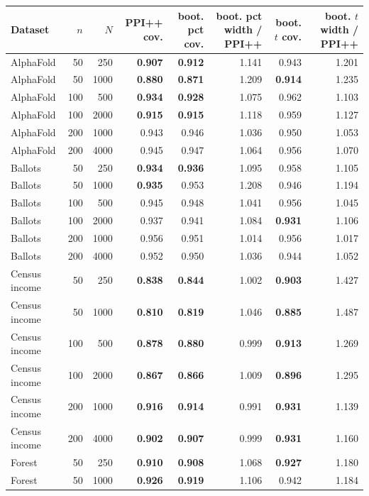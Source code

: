 \begin{tabular}{lrrrrrrr}
\toprule
Dataset & $n$ & $N$ & PPI++ cov. & boot. pct cov. & boot. pct width / PPI++ & boot. $t$ cov. & boot. $t$ width / PPI++ \\
\midrule
AlphaFold & 50 & 250 & \textbf{0.907} & \textbf{0.912} & 1.141 & 0.943 & 1.201 \\
AlphaFold & 50 & 1000 & \textbf{0.880} & \textbf{0.871} & 1.209 & \textbf{0.914} & 1.235 \\
AlphaFold & 100 & 500 & \textbf{0.934} & \textbf{0.928} & 1.075 & 0.962 & 1.103 \\
AlphaFold & 100 & 2000 & \textbf{0.915} & \textbf{0.915} & 1.118 & 0.959 & 1.127 \\
AlphaFold & 200 & 1000 & 0.943 & 0.946 & 1.036 & 0.950 & 1.053 \\
AlphaFold & 200 & 4000 & 0.945 & 0.947 & 1.064 & 0.956 & 1.070 \\
Ballots & 50 & 250 & \textbf{0.934} & \textbf{0.936} & 1.095 & 0.958 & 1.105 \\
Ballots & 50 & 1000 & \textbf{0.935} & 0.953 & 1.208 & 0.946 & 1.194 \\
Ballots & 100 & 500 & 0.945 & 0.948 & 1.041 & 0.956 & 1.045 \\
Ballots & 100 & 2000 & 0.937 & 0.941 & 1.084 & \textbf{0.931} & 1.106 \\
Ballots & 200 & 1000 & 0.956 & 0.951 & 1.014 & 0.956 & 1.017 \\
Ballots & 200 & 4000 & 0.952 & 0.950 & 1.036 & 0.944 & 1.052 \\
Census income & 50 & 250 & \textbf{0.838} & \textbf{0.844} & 1.002 & \textbf{0.903} & 1.427 \\
Census income & 50 & 1000 & \textbf{0.810} & \textbf{0.819} & 1.046 & \textbf{0.885} & 1.487 \\
Census income & 100 & 500 & \textbf{0.878} & \textbf{0.880} & 0.999 & \textbf{0.913} & 1.269 \\
Census income & 100 & 2000 & \textbf{0.867} & \textbf{0.866} & 1.009 & \textbf{0.896} & 1.295 \\
Census income & 200 & 1000 & \textbf{0.916} & \textbf{0.914} & 0.991 & \textbf{0.931} & 1.139 \\
Census income & 200 & 4000 & \textbf{0.902} & \textbf{0.907} & 0.999 & \textbf{0.931} & 1.160 \\
Forest & 50 & 250 & \textbf{0.910} & \textbf{0.908} & 1.068 & \textbf{0.927} & 1.180 \\
Forest & 50 & 1000 & \textbf{0.926} & \textbf{0.919} & 1.106 & 0.942 & 1.184 \\

\end{tabular}
